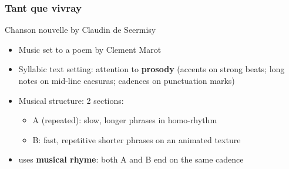 \documentclass{article}
\begin{document}
  \subsubsection{Tant que vivray}
  Chanson nouvelle by Claudin de Seermisy
  \begin{itemize}
    \item Music set to a poem by Clement Marot
    \item Syllabic text setting: attention to \textbf{prosody} (accents on strong beats; long notes on mid-line caesuras; cadences on punctuation marks)
    \item Musical structure: 2 sections:
      \begin{itemize}
        \item A (repeated): slow, longer phrases in homo-rhythm
        \item B: fast, repetitive shorter phrases on an animated texture
      \end{itemize}
    \item uses \textbf{musical rhyme}: both A and B end on the same cadence
  \end{itemize}
 
\end{document}
